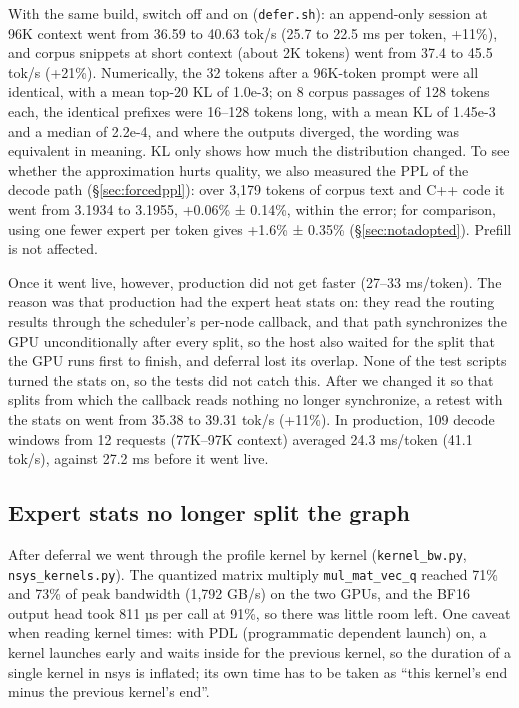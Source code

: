 \documentclass[11pt,a4paper]{article}
\newcommand{\code}[1]{\texttt{#1}}
\newcommand{\tps}{tok/s}
\begin{document}
With the same build, switch off and on (\code{defer.sh}): an append-only session at 96K context went from 36.59 to 40.63 \tps{} (25.7 to 22.5 ms per token, +11\%), and corpus snippets at short context (about 2K tokens) went from 37.4 to 45.5 \tps{} (+21\%). Numerically, the 32 tokens after a 96K-token prompt were all identical, with a mean top-20 KL of 1.0e-3; on 8 corpus passages of 128 tokens each, the identical prefixes were 16--128 tokens long, with a mean KL of 1.45e-3 and a median of 2.2e-4, and where the outputs diverged, the wording was equivalent in meaning. KL only shows how much the distribution changed. To see whether the approximation hurts quality, we also measured the PPL of the decode path (\S\ref{sec:forcedppl}): over 3,179 tokens of corpus text and C++ code it went from 3.1934 to 3.1955, +0.06\% ± 0.14\%, within the error; for comparison, using one fewer expert per token gives +1.6\% ± 0.35\% (\S\ref{sec:notadopted}). Prefill is not affected.

Once it went live, however, production did not get faster (27--33 ms/token). The reason was that production had the expert heat stats on: they read the routing results through the scheduler's per-node callback, and that path synchronizes the GPU unconditionally after every split, so the host also waited for the split that the GPU runs first to finish, and deferral lost its overlap. None of the test scripts turned the stats on, so the tests did not catch this. After we changed it so that splits from which the callback reads nothing no longer synchronize, a retest with the stats on went from 35.38 to 39.31 \tps{} (+11\%). In production, 109 decode windows from 12 requests (77K--97K context) averaged 24.3 ms/token (41.1 \tps{}), against 27.2 ms before it went live.

\subsection{Expert stats no longer split the graph}
\label{sec:stats}

After deferral we went through the profile kernel by kernel (\code{kernel\_bw.py}, \code{nsys\_kernels.py}). The quantized matrix multiply \code{mul\_mat\_vec\_q} reached 71\% and 73\% of peak bandwidth (1,792 GB/s) on the two GPUs, and the BF16 output head took 811 µs per call at 91\%, so there was little room left. One caveat when reading kernel times: with PDL (programmatic dependent launch) on, a kernel launches early and waits inside for the previous kernel, so the duration of a single kernel in nsys is inflated; its own time has to be taken as ``this kernel's end minus the previous kernel's end''.
\end{document}
